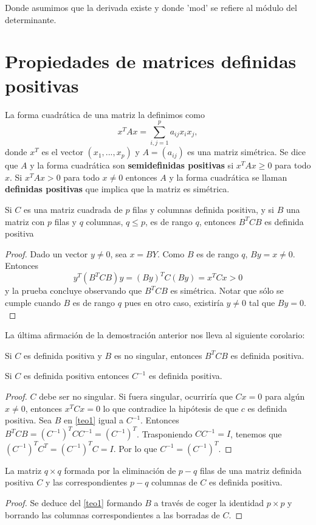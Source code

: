 Donde asumimos que la derivada existe y donde 'mod' se refiere al módulo del determinante. \cite{anderson1958introduction} \\

\section{Propiedades de matrices definidas positivas}
La forma cuadrática de una matriz la definimos como 
\[x^TAx=\sum_{i,j=1}^p a_{ij}x_ix_j, \]
donde $x^T$ es el vector $(x_1,...,x_p)$ y $A=(a_{ij})$ es una matriz simétrica. Se dice que $A$ y la forma cuadrática son \textbf{semidefinidas positivas} si $x^TAx \geq 0$ para todo $x$. Si $x^TAx > 0$ para todo $x \neq 0$ entonces $A$ y la forma cuadrática se llaman \textbf{definidas positivas} que implica que la matriz es simétrica.
\begin{teorema}\label{teo1}
Si $C$ es una matriz cuadrada de $p$ filas y columnas definida positiva, y si $B$ una matriz con $p$ filas y $q$ columnas, $q \leq p$, es de rango $q$, entonces $B^TCB$ es definida positiva
\end{teorema}
\begin{proof}
Dado un vector $y\neq0$, sea $x=BY$. Como $B$ es de rango $q$, $By=x\neq 0$. Entonces
\[ y^T(B^TCB)y=(By)^TC(By)=x^TCx>0 \]
y la prueba concluye observando que  $B^TCB$ es simétrica. Notar que sólo se cumple cuando $B$ es de rango $q$ pues en otro caso, existiría $y \neq 0$ tal que $By=0$. \cite{anderson1958introduction}
\end{proof}
La última afirmación de la demostración anterior nos lleva al siguiente corolario:
\begin{corolario}
Si $C$ es definida positiva y $B$ es no singular, entonces $B^TCB$ es definida positiva.
\end{corolario}
\begin{corolario}
Si $C$ es definida positiva entonces $C^{-1}$ es definida positiva.
\end{corolario}
\begin{proof}
$C$ debe ser no singular. Si fuera singular, ocurriría que $Cx=0$ para algún $x \neq 0$, entonces $x^TCx=0$ lo que contradice la hipótesis de que $c$ es definida positiva. Sea $B$ en \autoref{teo1} igual a $C^{-1}$. Entonces $B^TCB=(C^{-1})^TCC^{-1}=(C^{-1})^T$. Trasponiendo $CC^{-1}=I$, tenemos que $(C^{-1})^TC^T=(C^{-1})^TC=I$. Por lo que $C^{-1}=(C^{-1})^T$.
\end{proof}

\begin{corolario}
La matriz $q \times q$ formada por la eliminación de $p-q$ filas de una matriz definida positiva $C$ y las correspondientes $p-q$ columnas de $C$ es definida positiva.
\end{corolario}
\begin{proof}
Se deduce del \autoref{teo1} formando $B$ a través de coger la identidad $p \times p$ y borrando las columnas correspondientes a las borradas de $C$.
\end{proof}

